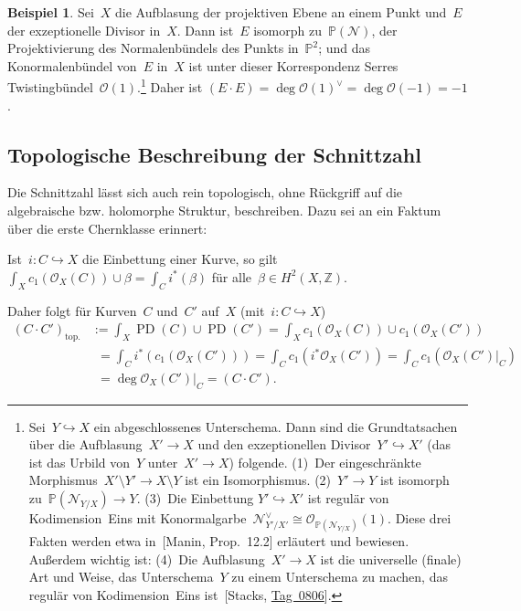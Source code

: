 \documentclass[a4paper,ngerman,12pt]{scrartcl}
\theoremstyle{definition}
\newtheorem{ex}[defn]{Beispiel}
\theoremstyle{plain}
\theoremstyle{remark}
\newcommand{\ZZ}{\mathbb{Z}}
\newcommand{\PP}{\mathbb{P}}
\newcommand{\N}{\mathcal{N}}
\renewcommand{\O}{\mathcal{O}}
\newcommand{\PD}{\operatorname{PD}}
\begin{document}
\begin{ex}Sei~$X$ die Aufblasung der projektiven Ebene an einem Punkt und~$E$
der exzeptionelle Divisor in~$X$. Dann ist~$E$ isomorph zu~$\PP(\N)$, der
Projektivierung des Normalenbündels des Punkts in~$\PP^2$; und das Konormalenbündel
von~$E$ in~$X$ ist unter dieser Korrespondenz Serres
Twistingbündel~$\O(1)$.\footnote{Sei~$Y \hookrightarrow X$ ein abgeschlossenes
Unterschema. Dann sind die Grundtatsachen über die Aufblasung~$X' \to X$
und den exzeptionellen Divisor~$Y' \hookrightarrow X'$ (das ist das Urbild
von~$Y$ unter~$X' \to X$) folgende. (1)~Der eingeschränkte Morphismus~$X'
\setminus Y' \to X \setminus Y$ ist ein Isomorphismus. (2)~$Y' \to Y$ ist
isomorph zu~$\PP(\N_{Y/X}) \to Y$. (3)~Die Einbettung $Y' \hookrightarrow X'$
ist regulär von Kodimension~Eins mit Konormalgarbe~$\N_{Y'/X'}^\vee \cong
\O_{\PP(\N_{Y/X})}(1)$. Diese drei Fakten werden etwa in~[Manin, Prop.~12.2]
erläutert und bewiesen. Außerdem wichtig ist:
(4)~Die Aufblasung~$X' \to X$ ist die universelle
(finale) Art und Weise, das Unterschema~$Y$ zu einem Unterschema zu machen, das regulär
von Kodimension~Eins ist~[Stacks,
\href{http://stacks.math.columbia.edu/tag/0806}{Tag~0806}].} Daher ist
$(E \cdot E) = \deg \O(1)^\vee = \deg \O(-1) = -1$.
\end{ex}


\subsection*{Topologische Beschreibung der Schnittzahl}

Die Schnittzahl lässt sich auch rein topologisch, ohne Rückgriff auf
die algebraische bzw. holomorphe Struktur, beschreiben. Dazu sei an ein Faktum
über die erste Chernklasse erinnert:

\begin{fact}Ist~$i : C \hookrightarrow X$ die
Einbettung einer Kurve, so gilt~$\int_X c_1(\O_X(C)) \cup \beta = \int_C
i^*(\beta)$ für alle~$\beta \in H^2(X,\ZZ)$.
\end{fact}

Daher folgt für Kurven~$C$ und~$C'$ auf~$X$ (mit~$i : C \hookrightarrow X$)
\begin{align*}
  (C \cdot C')_{\text{top.}}
  &:= \int_X \PD(C) \cup \PD(C')
  = \int_X c_1(\O_X(C)) \cup c_1(\O_X(C')) \\[0.5em]
  &\phantom{:}= \int_C i^*(c_1(\O_X(C')))
  = \int_C c_1(i^*\O_X(C'))
  = \int_C c_1(\O_X(C')|_C) \\[0.5em]
  &\phantom{:}= \deg \O_X(C')|_C
  = (C \cdot C').
\end{align*}
\end{document}
